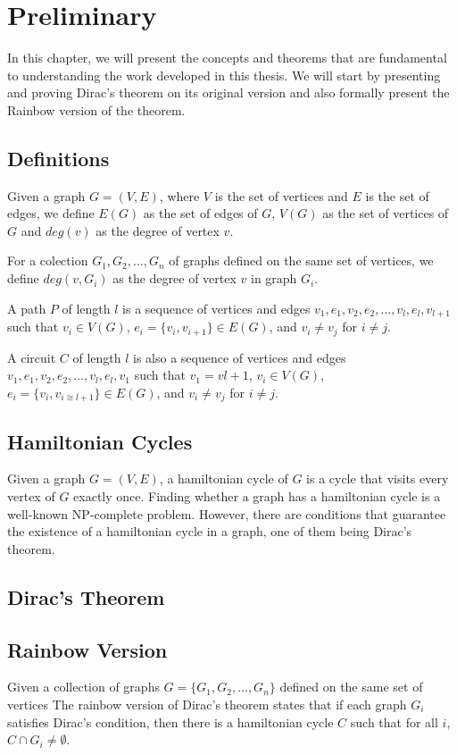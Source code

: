 
\chapter{Preliminary}

In this chapter, we will present the concepts and theorems that are fundamental to understanding the 
work developed in this thesis. We will start by presenting and proving Dirac's theorem on its original
version and also formally present the Rainbow version of the theorem.

\section{Definitions}

Given a graph $G = (V, E)$, where $V$ is the set of vertices and $E$ is the set of edges, we define $E(G)$ as
the set of edges of $G$, $V(G)$ as the set of vertices of $G$ and $deg(v)$ as the degree of vertex $v$.

For a colection $G_1, G_2, \ldots, G_n$ of graphs defined on the same set of vertices, we define
$deg(v, G_i)$ as the degree of vertex $v$ in graph $G_i$.

A path $P$ of length $l$ is a sequence of vertices and edges $v_1, e_1, v_2, e_2, \ldots, v_{l}, e_{l}, v_{l + 1}$ such that
$v_i \in V(G)$, $e_i = \{v_i, v_{i + 1}\} \in E(G)$, and $v_i \neq v_j$ for $i \neq j$.

A circuit $C$ of length $l$ is also a sequence of vertices and edges $v_1, e_1, v_2, e_2, \ldots, v_{l}, e_{l}, v_{1}$ such that
$v_{1} = v{l + 1}$, $v_i \in V(G)$, $e_i = \{v_i, v_{i \cong l + 1}\} \in E(G)$, and $v_i \neq v_j$ for $i \neq j$.

\section{Hamiltonian Cycles}

Given a graph $G = (V, E)$, a hamiltonian cycle of $G$ is a cycle that visits every vertex of $G$ exactly once.
Finding whether a graph has a hamiltonian cycle is a well-known NP-complete problem. 
However, there are conditions that guarantee the existence of a hamiltonian cycle in a graph, one of them being Dirac's theorem.

\section{Dirac's Theorem}

\section{Rainbow Version}

Given a collection of graphs  $G = \{G_1, G_2, \ldots, G_n\}$ defined on the same set of vertices
The rainbow version of Dirac's theorem states that if each graph $G_i$ satisfies Dirac's condition, 
then there is a hamiltonian cycle $C$ such that for all $i$, $C \cap G_i \neq \emptyset$.
